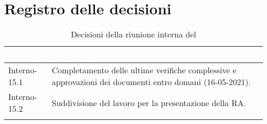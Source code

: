 \section{Registro delle decisioni}
{
\renewcommand{\arraystretch}{1.5}
\centering
\begin{longtable}{C{3cm} C{9cm}}
\textcolor{white}{\textbf{Codice}}&
\textcolor{white}{\textbf{Decisione}}\\	

\endhead
		
Interno-15.1 & Completamento delle ultime verifiche complessive e approvazioni dei documenti entro domani (16-05-2021). \\
Interno-15.2 & Suddivisione del lavoro per la presentazione della RA. \\

\caption{Decisioni della riunione interna del \Data{}}
\end{longtable}
}

